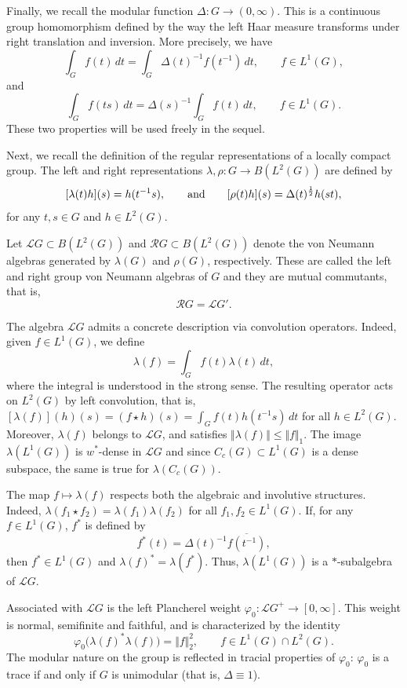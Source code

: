\documentclass[12pt]{amsart}
\newcommand{\norm}[1]{\Vert#1\Vert}
\theoremstyle{remark}
\theoremstyle{definition}
\numberwithin{equation}{section}
\begin{document}
Finally, we recall the modular function $\Delta \colon G \to (0,\infty)$. 
This is a continuous group homomorphism defined by the way the left Haar measure transforms under right translation and inversion. More precisely, we have
\[
\int_G f(t)\, dt = \int_G \Delta(t)^{-1} f(t^{-1})\, dt, \qquad f \in L^1(G),
\]
and
\[
\int_G f(ts)\, dt = \Delta(s)^{-1} \int_G f(t)\, dt, \qquad f \in L^1(G).
\]
These two properties will be used freely in the sequel.

Next, we recall the definition of the regular representations of a locally compact group. The left and right representations 
$\lambda, \rho \colon G \to B(L^2(G))$ are defined by
\[
[\lambda(t)h](s) = h(t^{-1}s), \qquad
\hbox{and}\qquad
[\rho(t)h](s) = \Delta(t)^{\frac12} h(st),
\]
for any $t,s \in G$ and $h \in L^2(G)$. 

Let ${\mathcal L}G \subset B(L^2(G))$ and ${\mathcal R}G \subset B(L^2(G))$ denote the von Neumann algebras generated by $\lambda(G)$ and $\rho(G)$, respectively.  
These are called the left and right group von Neumann algebras of \(G\) and they are mutual commutants, that is,
\begin{equation}\label{2Comm}
\mathcal{R}G = \mathcal{L}G'.
\end{equation}

The algebra \(\mathcal{L}G\) admits a concrete description via convolution operators. Indeed, given $f \in L^1(G)$, we define
\[
\lambda(f) = \int_G f(t) \lambda(t)\, dt,
\]
where the integral is understood in the strong sense.  
The resulting operator acts on \(L^2(G)\) by left convolution, that is, $[\lambda(f)](h)(s) = (f \star h)(s) = \int_G f(t)h(t^{-1}s) \, dt$ for all $h \in L^2(G)$.  
Moreover, $\lambda(f)$ belongs to ${\mathcal L}G$, and satisfies   
$\norm{\lambda(f)} \leq \norm{f}_1$.  
The image $\lambda(L^1(G))$ is $w^*$-dense in ${\mathcal L}G$ 
and since $C_c(G) \subset L^1(G)$ is a 
dense subspace, the same is true for $\lambda(C_c(G))$.
 

The map \(f\mapsto\lambda(f)\) respects both the algebraic and involutive structures. Indeed, $\lambda(f_1\star f_2)=\lambda(f_1)\lambda(f_2)$ for all $f_1,f_2\in L^1(G)$. If, for
any $f\in L^1(G)$, \(f^*\) is defined by
$$
f^*(t) = \Delta(t)^{-1}\overline{f(t^{-1})},
$$
then $f^*\in L^1(G)$ and $\lambda(f)^*=\lambda(f^*)$. Thus, $\lambda(L^1(G))$ is a $*$-subalgebra of ${\mathcal L}G$. 


Associated with \(\mathcal{L}G\) is the left Plancherel weight 
$
\varphi_0\colon {\mathcal L}G^+\longrightarrow [0,\infty].
$
This weight is normal, semifinite and faithful, and 
is characterized by the identity
\begin{equation}\label{2FP}
\varphi_0\bigl(\lambda(f)^*\lambda(f)
\bigr) = \norm{f}_{2}^2,\qquad f\in L^1(G)\cap L^2(G).
\end{equation}
The modular nature on the group is reflected in tracial properties of \(\varphi_0\): $\varphi_0$ is a trace if and only if $G$ is unimodular (that is, $\Delta\equiv 1$).
\end{document}
